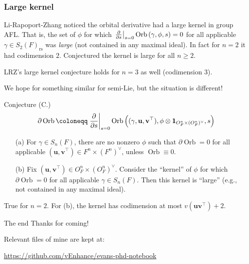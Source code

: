 \documentclass[11pt]{beamer}
\DeclareMathOperator{\Orb}{Orb}
\renewcommand{\OO}{O}
\newcommand{\guv}{{(\gamma, \uu, \vv^\top)}}
\newcommand{\oneV}{\mathbf{1}_{\OO_F^n \times (\OO_F^n)^\vee}}
\newcommand{\rs}{_{\text{rs}}}
\newcommand{\uu}{\mathbf{u}}
\newcommand{\vv}{\mathbf{v}}
\begin{document}
\begin{frame}
  \frametitle{Large kernel}
  \begin{itemize}
  \ii Li-Rapoport-Zhang noticed the orbital derivative had a large kernel in group AFL.
  \ii That is, the set of $\phi$ for which
    $\left. \pdv{}{s} \right\rvert_{s=0} \Orb \left(\gamma, \phi, s \right) = 0$
    for all applicable $\gamma \in S_2(F)\rs$ was \emph{large}
    (not contained in any maximal ideal).
  \ii In fact for $n=2$ it had codimension $2$.
  \ii Conjectured the kernel is large for all $n \ge 2$.
  \end{itemize}
  \begin{theorem}
    [C.]
    LRZ's large kernel conjecture holds for $n=3$ as well (codimension $3$).
  \end{theorem}
  We hope for something similar for semi-Lie, but the situation is different!
\end{frame}
\begin{frame}
  \begin{block}{Conjecture (C.)}
    \[ \partial \Orb \coloneqq \left. \pdv{}{s} \right\rvert_{s=0}
      \Orb \left(\guv, \phi \otimes \oneV, s \right) \]
    \begin{enumerate}
    \item[(a)] For $\gamma \in S_n(F)$,
    there are no nonzero $\phi$ such that $\partial \Orb = 0$
    for all applicable $(\uu, \vv^\top) \in F^n \times (F^n)^\vee$, unless $\Orb \equiv 0$.

    \item[(b)] Fix $(\uu, \vv^\top) \in \OO_F^n \times (\OO_F^n)^\vee$.
    Consider the ``kernel'' of $\phi$ for which $\partial \Orb = 0$
    for all applicable $\gamma \in S_n(F)$.
    Then this kernel is ``large'' (e.g., not contained in any maximal ideal).
    \end{enumerate}
  \end{block}
  \begin{theorem}
    [C.]
    True for $n=2$.
    For (b), the kernel has codimension at most $v(\uu\vv^\top)+2$.
  \end{theorem}
\end{frame}

\begin{frame}
  \begin{block}{The end}
    Thanks for coming!
  \end{block}

  Relevant files of mine are kept at:
  \begin{itemize}
    \ii \url{https://github.com/vEnhance/evans-phd-notebook}
  \end{itemize}
\end{frame}
\end{document}
